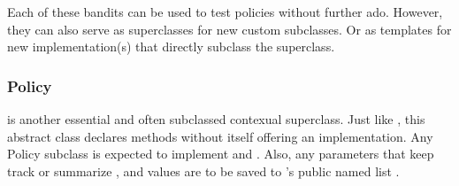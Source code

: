\documentclass[nojss]{jss}\usepackage[]{graphicx}\usepackage[]{color}
\begin{document}
Each of these bandits can be used to test policies without further ado. However, they can also serve as superclasses for new custom  subclasses. Or as templates for new  implementation(s) that directly subclass the  superclass.

\subsubsection{Policy}

 is another essential and often subclassed contexual superclass. Just like , this abstract class declares methods without itself offering an implementation. Any Policy subclass is expected to implement  and . Also, any parameters that keep track or summarize ,  and  values are to be saved to 's public named list .
\end{document}
